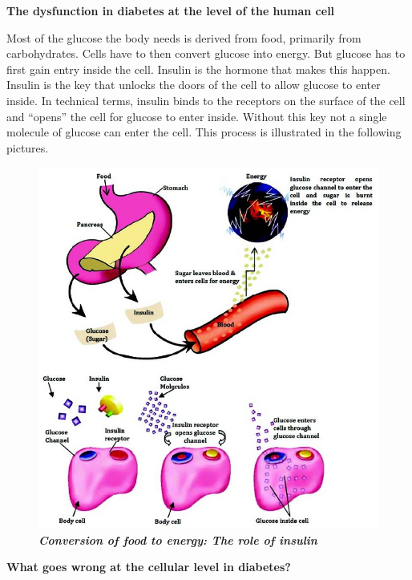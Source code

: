\noindent
\textbf{The dysfunction in diabetes at the level of the human cell}

Most of the glucose the body needs is derived from food, primarily from carbohydrates. Cells have to then convert glucose into energy. But glucose has to first gain entry inside the cell. Insulin is the hormone that makes this happen. Insulin is the key that unlocks the doors of the cell to allow glucose to enter inside. In technical terms, insulin binds to the receptors on the surface of the cell and “opens” the cell for glucose to enter inside. Without this key not a single molecule of glucose can enter the cell. This process is illustrated in the following pictures.

\begin{figure}[h]
\centering
\includegraphics[scale=2.3]{images/019.jpg}\\
\textbf{\textit{Conversion of food to energy: The role of insulin}}
\end{figure}

\newpage
\noindent
\textbf{What goes wrong at the cellular level in diabetes?}

